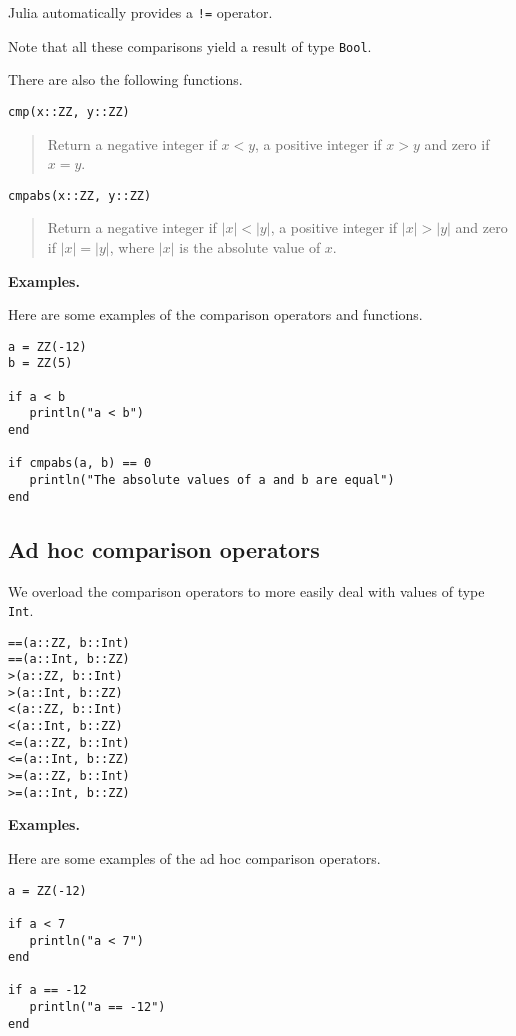 \documentclass[a4paper,10pt]{article}
\newcommand{\code}{\lstinline}
\newcommand{\desc}[1]{\vspace{-3mm}\begin{quote}#1\end{quote}}
\begin{document}
{{{Julia automatically provides a \code{!=} operator.

Note that all these comparisons yield a result of type \code{Bool}.

There are also the following functions.

\begin{lstlisting}
cmp(x::ZZ, y::ZZ)
\end{lstlisting}

\desc{Return a negative integer if $x < y$, a positive integer if $x > y$ and zero if $x = y$.}

\begin{lstlisting}
cmpabs(x::ZZ, y::ZZ)
\end{lstlisting}

\desc{Return a negative integer if $|x| < |y|$, a positive integer if $|x| > |y|$ and zero if 
$|x| = |y|$, where $|x|$ is the absolute value of $x$.}

\textbf{Examples.}

Here are some examples of the comparison operators and functions.

\begin{lstlisting}
a = ZZ(-12)
b = ZZ(5)

if a < b
   println("a < b")
end

if cmpabs(a, b) == 0
   println("The absolute values of a and b are equal")
end
\end{lstlisting}

\subsection{Ad hoc comparison operators}

We overload the comparison operators to more easily deal with values of type \code{Int}.

\begin{lstlisting}
==(a::ZZ, b::Int)
==(a::Int, b::ZZ)
>(a::ZZ, b::Int)
>(a::Int, b::ZZ)
<(a::ZZ, b::Int)
<(a::Int, b::ZZ)
<=(a::ZZ, b::Int)
<=(a::Int, b::ZZ)
>=(a::ZZ, b::Int)
>=(a::Int, b::ZZ)
\end{lstlisting}

\textbf{Examples.}

Here are some examples of the ad hoc comparison operators.

\begin{lstlisting}
a = ZZ(-12)

if a < 7
   println("a < 7")
end

if a == -12
   println("a == -12")
end
\end{lstlisting}

}}}
\end{document}
